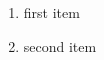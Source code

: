 \documentclass{article}
\begin{document}
\begin{enumerate}[label=(\Alph*):]
  \item first item
  \item second item
\end{enumerate}
\end{document}
